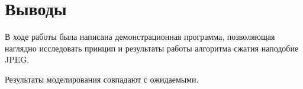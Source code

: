 \documentclass[12pt,a4paper]{article}
\begin{document}

    \section{Выводы}

        В ходе работы была написана демонстрационная программа, позволяющая наглядно исследовать принцип и результаты работы алгоритма сжатия наподобие JPEG.

        Результаты моделирования совпадают с ожидаемыми.

    \clearpage


    \nocite{*}
    
    
\end{document}
